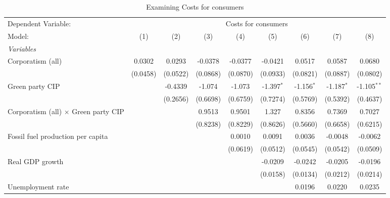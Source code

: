 
\begin{table}[htbp]
   \caption{Examining Costs for consumers}
   \centering
   \begin{tabular}{lcccccccc}
      \tabularnewline \midrule \midrule
      Dependent Variable: & \multicolumn{8}{c}{Costs for consumers}\\
      Model:                                      & (1)      & (2)      & (3)      & (4)      & (5)          & (6)          & (7)          & (8)\\  
      \midrule
      \emph{Variables}\\
      Corporatism (all)                           & 0.0302   & 0.0293   & -0.0378  & -0.0377  & -0.0421      & 0.0517       & 0.0587       & 0.0680\\   
                                                  & (0.0458) & (0.0522) & (0.0868) & (0.0870) & (0.0933)     & (0.0821)     & (0.0887)     & (0.0802)\\   
      Green party CIP                             &          & -0.4339  & -1.074   & -1.073   & -1.397$^{*}$ & -1.156$^{*}$ & -1.187$^{*}$ & -1.105$^{**}$\\   
                                                  &          & (0.2656) & (0.6698) & (0.6759) & (0.7274)     & (0.5769)     & (0.5392)     & (0.4637)\\   
      Corporatism (all) $\times$ Green party CIP  &          &          & 0.9513   & 0.9501   & 1.327        & 0.8356       & 0.7369       & 0.7027\\   
                                                  &          &          & (0.8238) & (0.8229) & (0.8626)     & (0.5660)     & (0.6658)     & (0.6215)\\   
      Fossil fuel production per capita           &          &          &          & 0.0010   & 0.0091       & 0.0036       & -0.0048      & -0.0062\\   
                                                  &          &          &          & (0.0619) & (0.0512)     & (0.0545)     & (0.0542)     & (0.0509)\\   
      Real GDP growth                             &          &          &          &          & -0.0209      & -0.0242      & -0.0205      & -0.0196\\   
                                                  &          &          &          &          & (0.0158)     & (0.0134)     & (0.0212)     & (0.0214)\\   
      Unemployment rate                           &          &          &          &          &              & 0.0196       & 0.0220       & 0.0235\\   

\end{tabular}
\end{table}
